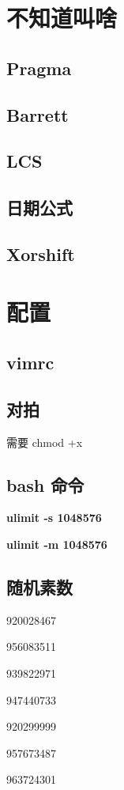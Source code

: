 \documentclass{article}
\begin{document}
\section{不知道叫啥}
\subsection{Pragma}


\subsection{Barrett}


\subsection{LCS}

\newpage

\subsection{日期公式}


\subsection{Xorshift}

\newpage



\section{配置}

\subsection{vimrc}

\subsection{对拍}
需要 chmod +x

\subsection{bash 命令}
\large \textbf{ulimit -s 1048576}

\large \textbf{ulimit -m 1048576}
\subsection{随机素数}
920028467

956083511

939822971

947440733

920299999

957673487

963724301
\end{document}
